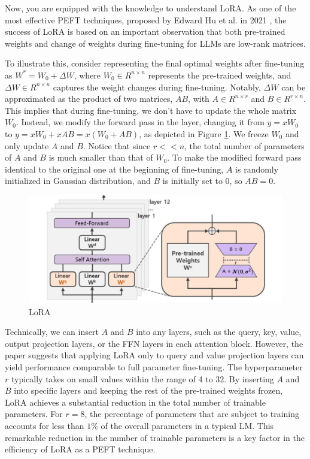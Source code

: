 Now, you are equipped with the knowledge to understand LoRA. As one of the most effective PEFT techniques, proposed by Edward Hu et al. in 2021 \cite{hu2021lora}, the success of LoRA is based on an important observation that both pre-trained weights and change of weights during fine-tuning for LLMs are low-rank matrices.

To illustrate this, consider representing the final optimal weights after fine-tuning as $W^* = W_0 + \Delta W$, where $W_0 \in {R}^{n \times n}$ represents the pre-trained weights, and $\Delta W \in {R}^{n \times n}$ captures the weight changes during fine-tuning. Notably, $\Delta W$ can be approximated as the product of two matrices, $AB$, with $A \in {R}^{n \times r}$ and $B \in {R}^{r \times n}$. This implies that during fine-tuning, we don't have to update the whole matrix $W_0$. Instead, we modify the forward pass in the layer, changing it from $y = xW_0$ to $y= xW_0 + xAB = x(W_0 + AB)$, as depicted in Figure \ref{fig:lora}. We freeze $W_0$ and only update $A$ and $B$. Notice that since $r << n$, the total number of parameters of $A$ and $B$ is much smaller than that of $W_0$. To make the modified forward pass identical to the original one at the beginning of fine-tuning, $A$ is randomly initialized in Gaussian distribution, and $B$ is initially set to 0, so $AB=0$. 

\begin{figure}[h]
    \centering
    \includegraphics[width=\textwidth]{figures/lora.jpeg}
    \caption{LoRA}
    \label{fig:lora}
\end{figure}

Technically, we can insert $A$ and $B$ into any layers, such as the query, key, value, output projection layers, or the FFN layers in each attention block. However, the paper suggests that applying LoRA only to query and value projection layers can yield performance comparable to full parameter fine-tuning. The hyperparameter $r$ typically takes on small values within the range of 4 to 32. 
By inserting $A$ and $B$ into specific layers and keeping the rest of the pre-trained weights frozen, LoRA achieves a substantial reduction in the total number of trainable parameters. For $r=8$, the percentage of parameters that are subject to training accounts for less than $1 \%$ of the overall parameters in a typical LM. This remarkable reduction in the number of trainable parameters is a key factor in the efficiency of LoRA as a PEFT technique.

